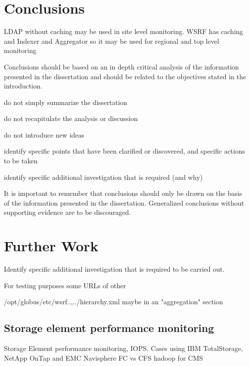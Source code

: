 \section{Conclusions}

LDAP without caching may be used in site level monitoring.
WSRF has caching and Indexer and Aggregator so it may be used for regional and top level monitoring


Conclusions should be based on an in depth critical analysis of the information presented in the dissertation and should be related to the objectives stated in the introduction.

do not simply summarize the dissertation

do not recapitulate the analysis or discussion

do not introduce new ideas

identify specific points that have been clarified or discovered, and specific actions to be taken

identify specific additional investigation that is required (and why)

It is important to remember that conclusions should only be drawn on the basis of the information presented in the dissertation. Generalized conclusions without supporting evidence are to be
discouraged.

\section{Further Work}
Identify specific additional investigation that is required to be carried out.

For testing purposes some URLs of other 

/opt/globus/etc/wsrf..,../hierarchy.xml maybe in an "aggregation" section

\subsection{Storage element performance monitoring}
Storage Element performance monitoring, IOPS. Cases using IBM TotalStorage, NetApp OnTap and EMC Navisphere
FC vs CFS \cite{brzezniak2008analysis}
hadoop for CMS \cite{hadoop}
